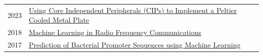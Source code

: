 \documentclass[
	10pt, %
]{FreemanCV}
\begin{document}
\begin{paracol}{2}



\begin{supertabular}{p{0.05\linewidth} p{0.95\linewidth}} %
	
	2023 & \href{
	https://ww1.microchip.com/downloads/aemDocuments/documents/MCU08/ApplicationNotes/ApplicationNotes/AN4889-Using-CIPs-To-Implement-Peltier-Plate-DS00004889.pdf
	}{
	Using Core Independent Peripherals (CIPs) to Implement a Peltier Cooled Metal Plate
	\scriptsize\faLink} \\
	2018 & \href{
	http://joshbooth.us/wp-content/uploads/2023/08/Machine-Learning-in-Radio-Frequency-Communications.pdf
	}{
	Machine Learning in Radio Frequency Communications
	\scriptsize\faLink} \\
	2017 & \href{
	http://joshbooth.us/wp-content/uploads/2023/08/poster_SBME_promoter_predictions.pdf
	}{
	Prediction of Bacterial Promoter Sequences using Machine Learning
	\scriptsize\faLink} \\
	
\end{supertabular}

\medskip %


\end{paracol} %

\end{document}
